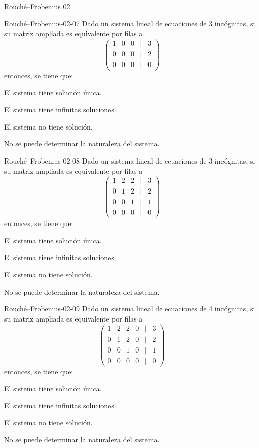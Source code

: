 \documentclass[a4,11pt]{aleph-notas}
\begin{document}
\begin{quiz}{Rouché–Frobenius 02}
\begin{multi}[]%
    {Rouché–Frobenius-02-07}
    Dado un sistema lineal de ecuaciones de 3 incógnitas, si su matriz ampliada es equivalente por filas a 
    \[
    \begin{pmatrix}
    1 & 0 & 0 & | & 3 \\
    0 & 0 & 0 & | & 2 \\
    0 & 0 & 0 & | & 0
    \end{pmatrix}
    \]
    entonces, se tiene que:
    \item El sistema tiene solución única.
    \item El sistema tiene infinitas soluciones.
    \item* El sistema no tiene solución.
    \item No se puede determinar la naturaleza del sistema.
\end{multi}

\begin{multi}[]%
    {Rouché–Frobenius-02-08}
    Dado un sistema lineal de ecuaciones de 3 incógnitas, si su matriz ampliada es equivalente por filas a 
    \[
    \begin{pmatrix}
    1 & 2 & 2 & | & 3 \\
    0 & 1 & 2 & | & 2 \\
    0 & 0 & 1 & | & 1 \\
    0 & 0 & 0 & | & 0
    \end{pmatrix}
    \]
    entonces, se tiene que:
    \item* El sistema tiene solución única.
    \item El sistema tiene infinitas soluciones.
    \item El sistema no tiene solución.
    \item No se puede determinar la naturaleza del sistema.
\end{multi}

\begin{multi}[]%
    {Rouché–Frobenius-02-09}
    Dado un sistema lineal de ecuaciones de 4 incógnitas, si su matriz ampliada es equivalente por filas a 
    \[
    \begin{pmatrix}
    1 & 2 & 2 & 0 & | & 3 \\
    0 & 1 & 2 & 0 & | & 2 \\
    0 & 0 & 1 & 0 & | & 1 \\
    0 & 0 & 0 & 0 & | & 0
    \end{pmatrix}
    \]
    entonces, se tiene que:
    \item El sistema tiene solución única.
    \item* El sistema tiene infinitas soluciones.
    \item El sistema no tiene solución.
    \item No se puede determinar la naturaleza del sistema.
\end{multi}


\end{quiz}
\end{document}
